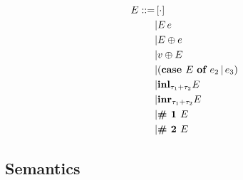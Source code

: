 \documentclass{article}
\begin{document}
\begin{multicols}{2}
\begin{equation*}
\begin{split}
				E ::=
				&\, [\cdot] \\
				&| E\, e \\
				&| E \oplus e \\
				&| v \oplus E \\
				&| (\text{\bf case } E \text{ \bf of } e_2 \,|\, e_3) \\
				&| {\bf inl}_{\tau_1 + \tau_2} E \\
				&| {\bf inr}_{\tau_1 + \tau_2} E \\
				&| \text{\bf \# 1 } E \\
				&| \text{\bf \# 2 } E \\
			\end{split}
		\end{equation*}
	\end{multicols}

		\subsection{Semantics}
\end{document}
